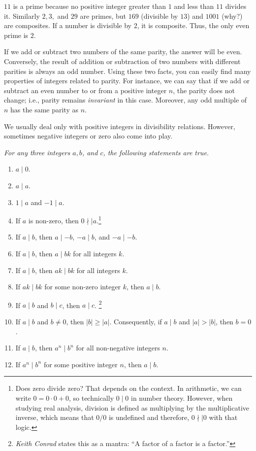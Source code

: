 \documentclass{subfile}
\begin{document}
	\begin{example}
		$11$ is a prime because no positive integer greater than $1$ and less than $11$ divides it. Similarly $2,3,$ and $29$ are primes, but $169$ (divisible by $13$) and $1001$ (why?) are composites. If a number is divisible by $2$, it is composite. Thus, the only even prime is $2$.
	\end{example}

	If we add or subtract two numbers of the same parity, the answer will be even. Conversely, the result of addition or subtraction of two numbers with different parities is always an odd number. Using these two facts, you can easily find many properties of integers related to parity. For instance, we can say that if we add or subtract an even number to or from a positive integer $n$, the parity does not change; i.e., parity remains {\it invariant} in this case. Moreover, any odd multiple of $n$ has the same parity as $n$.

	We usually deal only with positive integers in divisibility relations. However, sometimes negative integers or zero also come into play.

	\begin{proposition}\slshape\label{prop:basicdiv}
		For any three integers $a,b$, and $c$, the following statements are true.
		\begin{enumerate}
			\item $a\mid 0$.
			\item $a\mid a$.
			\item $1\mid a$ and $-1\mid a$.
			\item If $a$ is non-zero, then $0 \nmid\mid a$.\footnote{Does zero divide zero? That depends on the context. In arithmetic, we can write $0 = 0\cdot 0 + 0$, so technically $0 \mid 0$ in number theory. However, when studying real analysis, division is defined as multiplying by the multiplicative inverse, which means that $0/0$ is undefined and therefore, $0 \nmid \mid 0$ with that logic.}
			\item If $a \mid b$, then $a\mid -b$, $-a\mid b$, and $-a\mid -b$.
			\item If $a\mid b$, then $a\mid bk$ for all integers $k$.
			\item If $a\mid b$, then $ak\mid bk$ for all integers $k$.
			\item If $ak\mid bk$ for some non-zero integer $k$, then $a\mid b$.
			\item If $a\mid b$ and $b\mid c$, then $a\mid c$. \footnote{\textit{Keith Conrad} states this as a mantra: ``A factor of a factor is a factor.''}
			\item If $a\mid b$ and $b\neq 0$, then $|b| \geq |a|$. Consequently, if $a\mid b$ and $|a|>|b|$, then $b=0$.
			\item If $a\mid b$, then $a^n\mid b^n$ for all non-negative integers $n$.
			\item If $a^n \mid b^n$ for some positive integer $n$, then $a\mid b$.
		\end{enumerate}

	\end{proposition}
\end{document}
